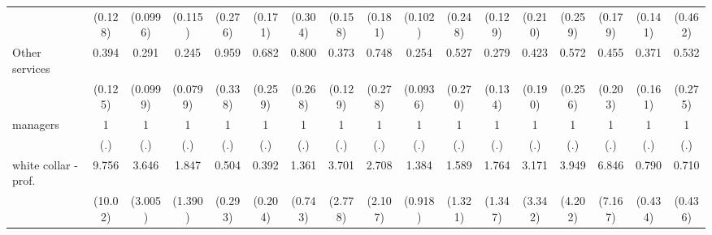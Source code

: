 {\begin{tabular}{l*{16}{c}}
                    &     (0.128)         &    (0.0996)         &     (0.115)         &     (0.276)         &     (0.171)         &     (0.304)         &     (0.158)         &     (0.181)         &     (0.102)         &     (0.248)         &     (0.129)         &     (0.210)         &     (0.259)         &     (0.179)         &     (0.141)         &     (0.462)         \\
[1em]
Other services      &       0.394\sym{**} &       0.291\sym{***}&       0.245\sym{***}&       0.959         &       0.682         &       0.800         &       0.373\sym{**} &       0.748         &       0.254\sym{***}&       0.527         &       0.279\sym{**} &       0.423         &       0.572         &       0.455         &       0.371\sym{*}  &       0.532         \\
                    &     (0.125)         &    (0.0999)         &    (0.0799)         &     (0.338)         &     (0.259)         &     (0.268)         &     (0.129)         &     (0.278)         &    (0.0936)         &     (0.270)         &     (0.134)         &     (0.190)         &     (0.256)         &     (0.203)         &     (0.161)         &     (0.275)         \\
[1em]
managers            &           1         &           1         &           1         &           1         &           1         &           1         &           1         &           1         &           1         &           1         &           1         &           1         &           1         &           1         &           1         &           1         \\
                    &         (.)         &         (.)         &         (.)         &         (.)         &         (.)         &         (.)         &         (.)         &         (.)         &         (.)         &         (.)         &         (.)         &         (.)         &         (.)         &         (.)         &         (.)         &         (.)         \\
[1em]
white collar - prof.&       9.756\sym{*}  &       3.646         &       1.847         &       0.504         &       0.392         &       1.361         &       3.701         &       2.708         &       1.384         &       1.589         &       1.764         &       3.171         &       3.949         &       6.846         &       0.790         &       0.710         \\
                    &     (10.02)         &     (3.005)         &     (1.390)         &     (0.293)         &     (0.204)         &     (0.743)         &     (2.778)         &     (2.107)         &     (0.918)         &     (1.321)         &     (1.347)         &     (3.342)         &     (4.202)         &     (7.167)         &     (0.434)         &     (0.436)         \\

\end{tabular}}

